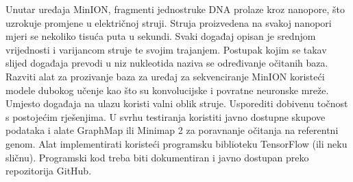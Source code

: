 \documentclass[times, utf8, diplomski, english]{fer}
\begin{document}
\begin{sazetak}
    Unutar uređaja MinION, fragmenti jednostruke DNA prolaze kroz nanopore, što uzrokuje promjene u električnoj struji. Struja proizvedena na svakoj nanopori mjeri se nekoliko tisuća puta u sekundi. Svaki događaj opisan je srednjom vrijednosti i varijancom struje te svojim trajanjem. Postupak kojim se takav slijed događaja prevodi u niz nukleotida naziva se određivanje očitanih baza. Razviti alat za prozivanje baza za uređaj za sekvenciranje MinION koristeći modele dubokog učenje kao što su konvolucijske i povratne neuronske mreže. Umjesto događaja na ulazu koristi valni oblik struje. Usporediti dobivenu točnost s postojećim rješenjima. U svrhu testiranja koristiti javno dostupne skupove podataka i alate GraphMap ili Minimap 2 za poravnanje očitanja na referentni genom. Alat implementirati koristeći programsku biblioteku TensorFlow (ili neku sličnu). Programski kod treba biti dokumentiran i javno dostupan preko repozitorija GitHub.
\end{sazetak}
\end{document}
